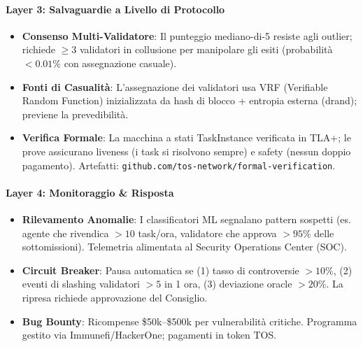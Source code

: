 \documentclass[11pt]{article}
\begin{document}
\begin{itemize}[noitemsep]
\paragraph{Layer 3: Salvaguardie a Livello di Protocollo}
\begin{itemize}[noitemsep]
  \item \textbf{Consenso Multi-Validatore}: Il punteggio mediano-di-5 resiste agli outlier; richiede $\geq3$ validatori in collusione per manipolare gli esiti (probabilità $<0.01\%$ con assegnazione casuale).
  \item \textbf{Fonti di Casualità}: L'assegnazione dei validatori usa VRF (Verifiable Random Function) inizializzata da hash di blocco + entropia esterna (drand); previene la prevedibilità.
  \item \textbf{Verifica Formale}: La macchina a stati TaskInstance verificata in TLA+; le prove assicurano liveness (i task si risolvono sempre) e safety (nessun doppio pagamento). Artefatti: \texttt{github.com/tos-network/formal-verification}.
\end{itemize}

\paragraph{Layer 4: Monitoraggio \& Risposta}
\begin{itemize}[noitemsep]
  \item \textbf{Rilevamento Anomalie}: I classificatori ML segnalano pattern sospetti (es. agente che rivendica $>10$ task/ora, validatore che approva $>95\%$ delle sottomissioni). Telemetria alimentata al Security Operations Center (SOC).
  \item \textbf{Circuit Breaker}: Pausa automatica se (1) tasso di controversie $>10\%$, (2) eventi di slashing validatori $>5$ in 1 ora, (3) deviazione oracle $>20\%$. La ripresa richiede approvazione del Consiglio.
  \item \textbf{Bug Bounty}: Ricompense \$50k--\$500k per vulnerabilità critiche. Programma gestito via Immunefi/HackerOne; pagamenti in token TOS.
\end{itemize}


\end{itemize}
\end{document}
